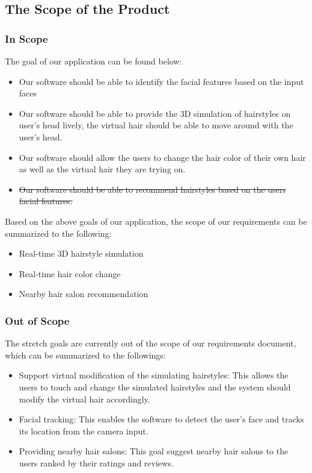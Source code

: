 \documentclass[12pt]{article}
\begin{document}
\subsection{The Scope of the Product}
 \subsubsection{In Scope}
The goal of our application can be found below:
 \begin{itemize}
     \item Our software should be able to identify the facial features based on the input faces
     \item Our software should be able to provide the 3D simulation of hairstyles on user's head lively, the virtual hair should be able to move around with the user's head.
     \item Our software should allow the users to change the hair color of their own hair as well as the virtual hair they are trying on.
     \item \sout{Our software should be able to recommend hairstyles based on the users facial features.}
 \end{itemize}
 
 \noindent
 Based on the above goals of our application, the scope of our requirements can be summarized to the following:
 \begin{itemize}
     \item Real-time 3D hairstyle simulation
     \item Real-time hair color change
     \item Nearby hair salon recommendation
 \end{itemize}

\subsubsection{Out of Scope}

The stretch goals are currently out of the scope of our requirements document, which can be summarized to the followings:

\begin{itemize}
    \item Support virtual modification of the simulating hairstyles: This allows the users to touch and change the simulated hairstyles and the system should modify the virtual hair accordingly.
    \item Facial tracking: This enables the software to detect the user's face and tracks its location from the camera input.
    \item Providing nearby hair salons: This goal suggest nearby hair salons to the users ranked by their ratings and reviews.
\end{itemize}
\end{document}
